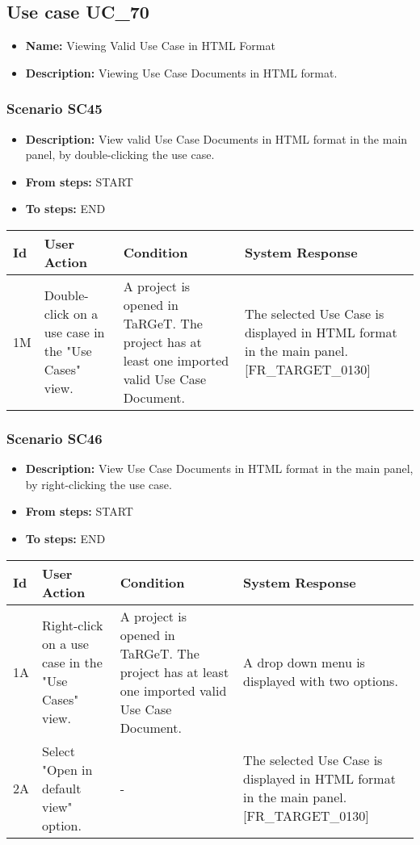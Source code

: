 \documentclass[a4paper,11pt]{article}
\newcommand{\bl}{\\ \hline}
\begin{document}
\subsection*{Use case UC_70}
\begin{itemize}
\item {\bf Name: }Viewing Valid Use Case in HTML Format
\item {\bf Description: } Viewing Use Case Documents in HTML format.
			
\end{itemize}
\subsubsection*{Scenario SC45}
\begin{itemize}
\item {\bf Description:} View valid Use Case Documents in HTML format in the
					main panel, by double-clicking the use case.
\item {\bf From steps:} START
\item {\bf To steps:} END
\end{itemize}
\begin{tabular}{|p{0.4in}|p{1.5in}|p{1.5in}|p{1.5in}|}
\hline
Id & User Action & Condition & System Response \bl 
1M & Double-click on a use case in the "Use Cases" view.
					 & A project is opened in TaRGeT. The project has at least
						one imported valid Use Case Document.  & The selected Use Case is displayed in HTML format in the
						main panel. [FR_TARGET_0130]\bl
\end{tabular}
\subsubsection*{Scenario SC46}
\begin{itemize}
\item {\bf Description:} View Use Case Documents in HTML format in the main
					panel, by right-clicking the use case.
\item {\bf From steps:} START
\item {\bf To steps:} END
\end{itemize}
\begin{tabular}{|p{0.4in}|p{1.5in}|p{1.5in}|p{1.5in}|}
\hline
Id & User Action & Condition & System Response \bl 
1A & Right-click on a use case in the "Use Cases" view. & A project is opened in TaRGeT. The project has at least
						one imported valid Use Case Document. & A drop down menu is displayed with two options.
					\bl
2A & Select "Open in default view" option. & - & The selected Use Case is displayed in HTML format in the
						main panel. [FR_TARGET_0130] \bl
\end{tabular}
\end{document}
